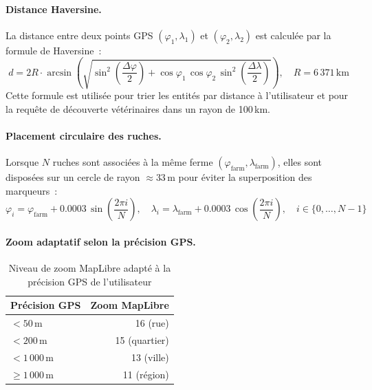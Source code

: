 \paragraph{Distance Haversine.}
La distance entre deux points GPS $(\varphi_1, \lambda_1)$ et $(\varphi_2, \lambda_2)$
est calculée par la formule de Haversine~:
\begin{equation}
d = 2R \cdot \arcsin\!\left(\sqrt{\sin^2\!\!\left(\frac{\Delta\varphi}{2}\right)
  + \cos\varphi_1\,\cos\varphi_2\,\sin^2\!\!\left(\frac{\Delta\lambda}{2}\right)}
  \right), \quad R = 6\,371\,\text{km}
\label{eq:haversine_ch3}
\end{equation}
Cette formule est utilisée pour trier les entités par distance à l'utilisateur et
pour la requête de découverte vétérinaires dans un rayon de 100\,km.

\paragraph{Placement circulaire des ruches.}
Lorsque $N$ ruches sont associées à la même ferme
$(\varphi_\text{farm},\lambda_\text{farm})$, elles sont disposées sur un cercle
de rayon $\approx 33$\,m pour éviter la superposition des marqueurs~:
\begin{equation}
\varphi_i = \varphi_\text{farm} + 0.0003\,\sin\!\left(\frac{2\pi i}{N}\right),\quad
\lambda_i = \lambda_\text{farm} + 0.0003\,\cos\!\left(\frac{2\pi i}{N}\right),\quad
i \in \{0,\ldots,N-1\}
\label{eq:circular_hive}
\end{equation}

\paragraph{Zoom adaptatif selon la précision GPS.}

\begin{table}[H]
\centering
\caption{Niveau de zoom MapLibre adapté à la précision GPS de l'utilisateur}
\label{tab:gps_zoom}
\begin{tabular}{lr}
\toprule
\textbf{Précision GPS} & \textbf{Zoom MapLibre} \\
\midrule
$< 50$\,m   & 16 (rue) \\
$< 200$\,m  & 15 (quartier) \\
$< 1\,000$\,m & 13 (ville) \\
$\geq 1\,000$\,m & 11 (région) \\
\bottomrule
\end{tabular}
\end{table}

